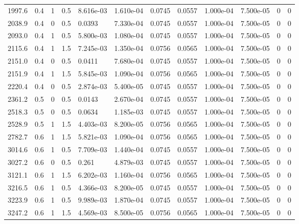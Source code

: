 \documentclass[preview]{standalone}
\begin{document}
{{\begin{tabular}{L{1.2cm}C{1.2cm} C{0.3cm}C{0.5cm} C{1.4cm}C{1.4cm} C{1.4cm}C{1.4cm} C{1.6cm}C{1.6cm} C{1.6cm}C{1.6cm}}
  1997.6  &   0.4  & 1     & 0.5 &  8.616e-03  & 1.610e-04  &  0.0745&   0.0557& 1.000e-04 & 7.500e-05   &  0 & 0  \\ 
  2038.9  &   0.4  & 0     & 0.5 &  0.0393  & 7.330e-04  &  0.0745&   0.0557& 1.000e-04 & 7.500e-05   &  0 & 0  \\ 
  2093.0  &   0.4  & 1     & 0.5 &  5.800e-03  & 1.080e-04  &  0.0745&   0.0557& 1.000e-04 & 7.500e-05   &  0 & 0  \\ 
  2115.6  &   0.4  & 1     & 1.5 &  7.245e-03  & 1.350e-04  &  0.0756&   0.0565& 1.000e-04 & 7.500e-05   &  0 & 0  \\ 
  2151.0  &   0.4  & 0     & 0.5 &  0.0411  & 7.680e-04  &  0.0745&   0.0557& 1.000e-04 & 7.500e-05   &  0 & 0  \\ 
  2151.9  &   0.4  & 1     & 1.5 &  5.845e-03  & 1.090e-04  &  0.0756&   0.0565& 1.000e-04 & 7.500e-05   &  0 & 0  \\ 
  2220.4  &   0.4  & 0     & 0.5 &  2.874e-03  & 5.400e-05  &  0.0745&   0.0557& 1.000e-04 & 7.500e-05   &  0 & 0  \\ 
  2361.2  &   0.5  & 0     & 0.5 &  0.0143  & 2.670e-04  &  0.0745&   0.0557& 1.000e-04 & 7.500e-05   &  0 & 0  \\ 
  2518.3  &   0.5  & 0     & 0.5 &  0.0634  & 1.185e-03  &  0.0745&   0.0557& 1.000e-04 & 7.500e-05   &  0 & 0  \\ 
  2528.9  &   0.5  & 1     & 1.5 &  4.403e-03  & 8.200e-05  &  0.0756&   0.0565& 1.000e-04 & 7.500e-05   &  0 & 0  \\ 
  2782.7  &   0.6  & 1     & 1.5 &  5.821e-03  & 1.090e-04  &  0.0756&   0.0565& 1.000e-04 & 7.500e-05   &  0 & 0  \\ 
  3014.6  &   0.6  & 1     & 0.5 &  7.709e-03  & 1.440e-04  &  0.0745&   0.0557& 1.000e-04 & 7.500e-05   &  0 & 0  \\ 
  3027.2  &   0.6  & 0     & 0.5 &  0.261  & 4.879e-03  &  0.0745&   0.0557& 1.000e-04 & 7.500e-05   &  0 & 0  \\ 
  3121.1  &   0.6  & 1     & 1.5 &  6.202e-03  & 1.160e-04  &  0.0756&   0.0565& 1.000e-04 & 7.500e-05   &  0 & 0  \\ 
  3216.5  &   0.6  & 1     & 0.5 &  4.366e-03  & 8.200e-05  &  0.0745&   0.0557& 1.000e-04 & 7.500e-05   &  0 & 0  \\ 
  3223.9  &   0.6  & 1     & 0.5 &  9.989e-03  & 1.870e-04  &  0.0745&   0.0557& 1.000e-04 & 7.500e-05   &  0 & 0  \\ 
  3247.2  &   0.6  & 1     & 1.5 &  4.569e-03  & 8.500e-05  &  0.0756&   0.0565& 1.000e-04 & 7.500e-05   &  0 & 0  \\ 

\end{tabular}}}
\end{document}
